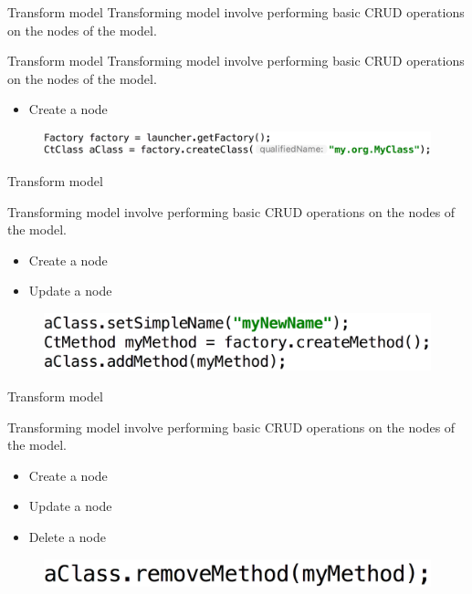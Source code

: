 \documentclass{beamer}
\begin{document}
\begin{frame}{Transform model}
Transforming model involve performing basic CRUD operations on the nodes of the model.

\end{frame}

\begin{frame}{Transform model}
Transforming model involve performing basic CRUD operations on the nodes of the model.
\begin{itemize}
\item Create a node
\end{itemize}

\begin{figure}
\centering
\includegraphics[width=\textwidth]{figures/transform/transfo-add}
\end{figure}
\end{frame}

\begin{frame}{Transform model}

Transforming model involve performing basic CRUD operations on the nodes of the model.
\begin{itemize}
\item Create a node
\item Update a node
\end{itemize}

\begin{figure}
\centering
\includegraphics[width=\textwidth]{figures/transform/transfo-update.pdf}
\end{figure}
\end{frame}

\begin{frame}{Transform model}

Transforming model involve performing basic CRUD operations on the nodes of the model.
\begin{itemize}
\item Create a node
\item Update a node
\item Delete a node
\end{itemize}

\begin{figure}
\centering
\includegraphics[width=\textwidth]{figures/transform/transfo-delete.pdf}
\end{figure}
\end{frame}
\end{document}
